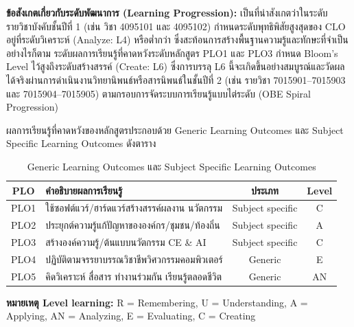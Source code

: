 \noindent\textbf{ข้อสังเกตเกี่ยวกับระดับพัฒนาการ (Learning Progression):} เป็นที่น่าสังเกตว่าในระดับรายวิชาบังคับชั้นปีที่ 1 (เช่น วิชา 4095101 และ 4095102) กำหนดระดับพุทธิพิสัยสูงสุดของ CLO อยู่ที่ระดับวิเคราะห์ (Analyze: L4) หรือต่ำกว่า ซึ่งสะท้อนการสร้างพื้นฐานความรู้และทักษะที่จำเป็น อย่างไรก็ตาม ระดับผลการเรียนรู้ที่คาดหวังระดับหลักสูตร PLO1 และ PLO3 กำหนด Bloom's Level ไว้สูงถึงระดับสร้างสรรค์ (Create: L6) ซึ่งการบรรลุ L6 นี้จะเกิดขึ้นอย่างสมบูรณ์และวัดผลได้จริงผ่านการดำเนินงานวิทยานิพนธ์หรือสารนิพนธ์ในชั้นปีที่ 2 (เช่น รายวิชา 7015901--7015903 และ 7015904--7015905) ตามกรอบการจัดระบบการเรียนรู้แบบไต่ระดับ (OBE Spiral Progression)



ผลการเรียนรู้ที่คาดหวังของหลักสูตรประกอบด้วย Generic Learning Outcomes และ Subject Specific Learning Outcomes ดังตาราง

\begin{table}[H]
  \centering
  \caption{Generic Learning Outcomes และ Subject Specific Learning Outcomes}
  \begin{tabularx}{\linewidth}{|c|Y|c|c|}
    \hline
    \textbf{PLO} & \textbf{คำอธิบายผลการเรียนรู้} & \textbf{ประเภท} & \textbf{Level} \\
    \hline
    PLO1 & ใช้ซอฟต์แวร์/ฮาร์ดแวร์สร้างสรรค์ผลงาน นวัตกรรม & Subject specific & C \\
    \hline
    PLO2 & ประยุกต์ความรู้แก้ปัญหาขององค์กร/ชุมชน/ท้องถิ่น & Subject specific & A \\
    \hline
    PLO3 & สร้างองค์ความรู้/ต้นแบบนวัตกรรม CE \& AI & Subject specific & C \\
    \hline
    PLO4 & ปฏิบัติตามจรรยาบรรณวิชาชีพวิศวกรรมคอมพิวเตอร์ & Generic & E \\
    \hline
    PLO5 & คิดวิเคราะห์ สื่อสาร ทำงานร่วมกัน เรียนรู้ตลอดชีวิต & Generic & AN \\
    \hline
  \end{tabularx}
\end{table}

\noindent\textbf{หมายเหตุ Level learning:} R = Remembering, U = Understanding, A = Applying, AN = Analyzing, E = Evaluating, C = Creating

